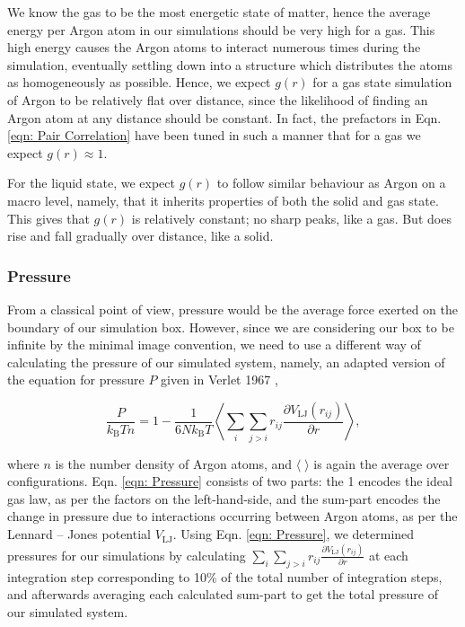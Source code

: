 \documentclass{IAYCPro}
\begin{document}
We know the gas to be the most energetic state of matter, hence the average energy per Argon atom in our simulations should be very high for a gas. This high energy causes the Argon atoms to interact numerous times during the simulation, eventually settling down into a structure which distributes the atoms as homogeneously as possible. Hence, we expect $g(r)$ for a gas state simulation of Argon to be relatively flat over distance, since the likelihood of finding an Argon atom at any distance should be constant. In fact, the prefactors in Eqn. \ref{eqn: Pair Correlation} have been tuned in such a manner that for a gas we expect $g(r) \approx 1$.

For the liquid state, we expect $g(r)$ to follow similar behaviour as Argon on a macro level, namely, that it inherits properties of both the solid and gas state. This gives that $g(r)$ is relatively constant; no sharp peaks, like a gas. But does rise and fall gradually over distance, like a solid.  

\subsubsection{Pressure}

From a classical point of view, pressure would be the average force exerted on the boundary of our simulation box. However, since we are considering our box to be infinite by the minimal image convention, we need to use a different way of calculating the pressure of our simulated system, namely, an adapted version of the equation for pressure $P$ given in Verlet 1967 \cite{verlet1967computer},

\begin{equation}
    \frac{P}{k_\mathrm{B}Tn} = 1 - \frac{1}{6Nk_\mathrm{B}T} \left\langle \sum_i \sum_{j>i} r_{ij}\frac{\partial V_\mathrm{LJ}(r_{ij})}{\partial r}\right\rangle,
    \label{eqn: Pressure}
\end{equation}

\raggedbottom
\newpage

where $n$ is the number density of Argon atoms, and $\langle \;\rangle$ is again the average over configurations. Eqn. \ref{eqn: Pressure} consists of two parts: the 1 encodes the ideal gas law, as per the factors on the left-hand-side, and the sum-part encodes the change in pressure due to interactions occurring between Argon atoms, as per the Lennard -- Jones potential $V_\mathrm{LJ}$. Using Eqn. \ref{eqn: Pressure}, we determined pressures for our simulations by calculating $\sum_i \sum_{j>i} r_{ij}\frac{\partial V_\mathrm{LJ}(r_{ij})}{\partial r}$ at each integration step corresponding to 10\% of the total number of integration steps, and afterwards averaging each calculated sum-part to get the total pressure of our simulated system.
\end{document}
